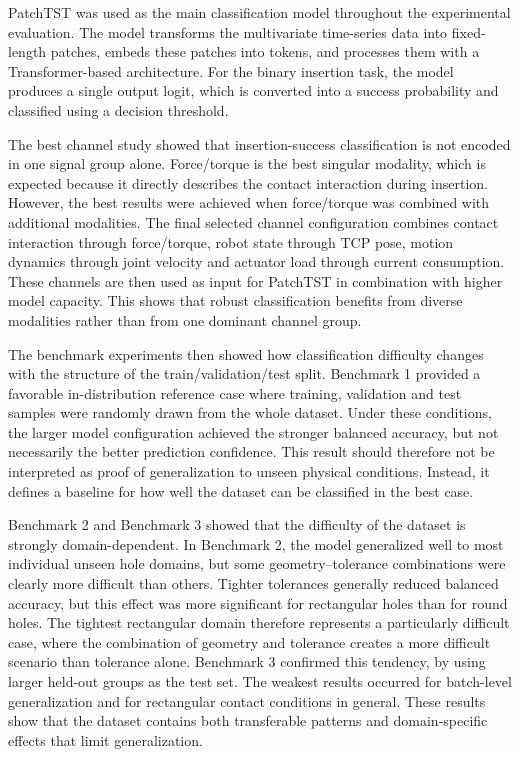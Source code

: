 PatchTST was used as the main classification model throughout the experimental evaluation. The model transforms the multivariate time-series data into fixed-length patches, embeds these patches into tokens, and processes them with a Transformer-based architecture. For the binary insertion task, the model produces a single output logit, which is converted into a success probability and classified using a decision threshold.

The best channel study showed that insertion-success classification is not encoded in one signal group alone. Force/torque is the best singular modality, which is expected because it directly describes the contact interaction during insertion. However, the best results were achieved when force/torque was combined with additional modalities. The final selected channel configuration combines contact interaction through force/torque, robot state through TCP pose, motion dynamics through joint velocity and actuator load through current consumption. These channels are then used as input for PatchTST in combination with higher model capacity. This shows that robust classification benefits from diverse modalities rather than from one dominant channel group.

The benchmark experiments then showed how classification difficulty changes with the structure of the train/validation/test split. Benchmark 1 provided a favorable in-distribution reference case where training, validation and test samples were randomly drawn from the whole dataset. Under these conditions, the larger model configuration achieved the stronger balanced accuracy, but not necessarily the better prediction confidence. This result should therefore not be interpreted as proof of generalization to unseen physical conditions. Instead, it defines a baseline for how well the dataset can be classified in the best case.

Benchmark 2 and Benchmark 3 showed that the difficulty of the dataset is strongly domain-dependent. In Benchmark 2, the model generalized well to most individual unseen hole domains, but some geometry--tolerance combinations were clearly more difficult than others. Tighter tolerances generally reduced balanced accuracy, but this effect was more significant for rectangular holes than for round holes. The tightest rectangular domain therefore represents a particularly difficult case, where the combination of geometry and tolerance creates a more difficult scenario than tolerance alone. Benchmark 3 confirmed this tendency, by using larger held-out groups as the test set. The weakest results occurred for batch-level generalization and for rectangular contact conditions in general. These results show that the dataset contains both transferable patterns and domain-specific effects that limit generalization.

